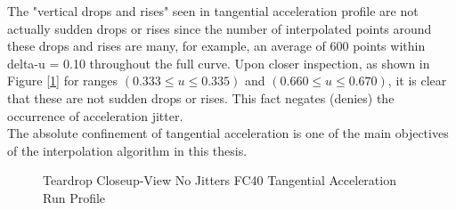 The "vertical drops and rises" seen in tangential acceleration profile are not actually sudden drops or rises since the number of interpolated points around these drops and rises are many, for example, an average of 600 points within delta-u = 0.10 throughout the full curve.  Upon closer inspection, as shown in Figure [\ref{img-chap4-Teardrop Closeup-View No Jitters FC40 Tangential Acceleration Run Profile}] for ranges $(0.333 \le u \le 0.335)$ and $(0.660 \le u \le 0.670)$, it is clear that these are not sudden drops or rises. This fact negates (denies) the occurrence of acceleration jitter.\\

The absolute confinement of tangential acceleration is one of the main objectives of the interpolation algorithm in this thesis.

\clearpage
\pagebreak
\begin{landscape}
	
\begin{figure}
\caption  {      Teardrop Closeup-View No Jitters FC40 Tangential Acceleration Run Profile}
\label{img-chap4-Teardrop Closeup-View No Jitters FC40 Tangential Acceleration Run Profile}
\centering
{}
\end{figure}
	
\end{landscape}

